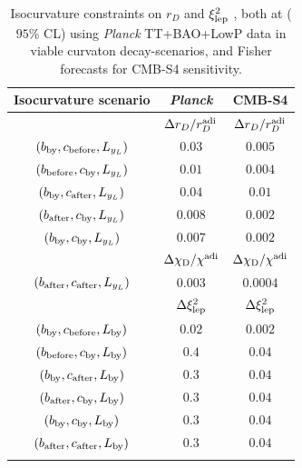 \begin{table}[htbp!]
\begin{center}
\begin{tabular}{ccc}
\hline
{\rm Isocurvature scenario} &  \emph{Planck} & CMB-S4 \\ \hline
  & $ \Delta r_D/r_{D}^{\rm adi}$ &$ \Delta r_D/r_{D}^{\rm adi}$\\ 
$(b_{\rm by},c_{\rm before},L_{y_{L}})$ & $0.03$&$0.005$\\
$(b_{\rm before},c_{\rm by},L_{y_{L}})$ &  $0.01$ &$0.004$\\
$(b_{\rm by},c_{\rm after},L_{y_{L}})$ &  $0.04$&$0.01$\\
$(b_{\rm after},c_{\rm by},L_{y_{L}})$ & $0.008$&$0.002$\\
$(b_{\rm by},c_{\rm by},L_{y_{L}})$ &  $0.007$&$0.002$\\ \hline 
& $\Delta \chi_{\rm D}/\chi_{\rm }^{\rm adi}$&$\Delta \chi_{\rm D}/\chi_{\rm }^{\rm adi}$ \\
$(b_{\rm after},c_{\rm after},L_{y_{L}})$ & $0.003$&$0.0004$ \\ \hline 
 &  $\Delta \xi^{2}_{\rm lep}$ &$\Delta \xi^{2}_{\rm lep}$\\
$(b_{\rm by},c_{\rm before},L_{\rm by})$ &$0.02$ &$0.002$\\
$(b_{\rm before},c_{\rm by},L_{\rm by})$ &$0.4$  & $0.04$\\
$(b_{\rm by},c_{\rm after},L_{\rm by})$ &$0.3$  &$0.04$\\
$(b_{\rm after},c_{\rm by},L_{\rm by})$ & $0.3$&$0.04$\\
$(b_{\rm by},c_{\rm by},L_{\rm by})$ & $0.3$ & $0.04$\\
$(b_{\rm after},c_{\rm after},L_{\rm by})$ & $0.3$ & $0.04$\\
\\ \hline \hline 
\end{tabular}
\caption{Isocurvature constraints on $r_D$ and $\xi_{\rm lep}^{2}$ , both at ($95\%$ CL) using \textit{Planck} TT+BAO+LowP data \cite{Smith:2015bln} in viable curvaton decay-scenarios, and Fisher forecasts for CMB-S4 sensitivity. 
\label{limits_rd}}
\end{center}
\end{table}
%

